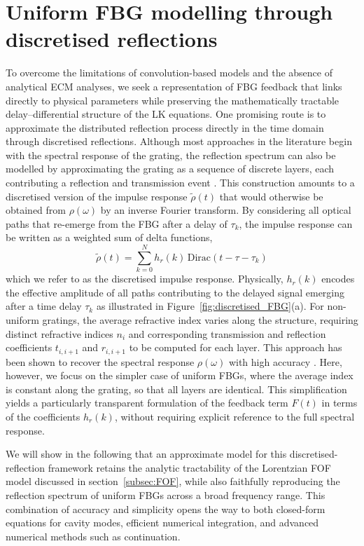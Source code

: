 \section{Uniform FBG modelling through discretised reflections}
\label{sec:FBG_discretised}
%
To overcome the limitations of convolution-based models and the absence of analytical ECM analyses, we seek a representation of FBG feedback that links directly to physical parameters while preserving the mathematically tractable delay–differential structure of the LK equations.
One promising route is to approximate the distributed reflection process directly in the time domain through discretised reflections.
Although most approaches in the literature begin with the spectral response of the grating, the reflection spectrum can also be modelled by approximating the grating as a sequence of discrete layers, each contributing a reflection and transmission event \cite{poladian2000simple, ghiringhelli2002time, feced2002efficient, skaar2001synthesis}.
This construction amounts to a discretised version of the impulse response $\tilde{\rho}(t)$ that would otherwise be obtained from $\rho(\omega)$ by an inverse Fourier transform.
By considering all optical paths that re-emerge from the FBG after a delay of $\tau_k$, the impulse response can be written as a weighted sum of delta functions,
%
\begin{equation}
    \label{eq:dicretised_impulse}
    \tilde{\rho}(t) = \sum_{k=0}^N h_r(k)\, \text{Dirac}(t-\tau-\tau_k)
\end{equation}
%
which we refer to as the discretised impulse response.
Physically, $h_r(k)$ encodes the effective amplitude of all paths contributing to the delayed signal emerging after a time delay $\tau_k$ as illustrated in Figure~\ref{fig:discretised_FBG}(a).
For non-uniform gratings, the average refractive index varies along the structure, requiring distinct refractive indices $n_i$ and corresponding transmission and reflection coefficients $t_{i,i+1}$ and $r_{i,i+1}$ to be computed for each layer.
This approach has been shown to recover the spectral response $\rho(\omega)$ with high accuracy \cite{ghiringhelli2002time}.
Here, however, we focus on the simpler case of uniform FBGs, where the average index is constant along the grating, so that all layers are identical.
This simplification yields a particularly transparent formulation of the feedback term $F(t)$ in terms of the coefficients $h_r(k)$, without requiring explicit reference to the full spectral response.
%
\par
%
We will show in the following that an approximate model for this discretised-reflection framework retains the analytic tractability of the Lorentzian FOF model discussed in section~\ref{subsec:FOF}, while also faithfully reproducing the reflection spectrum of uniform FBGs across a broad frequency range.
This combination of accuracy and simplicity opens the way to both closed-form equations for cavity modes, efficient numerical integration, and advanced numerical methods such as continuation.
%
%
